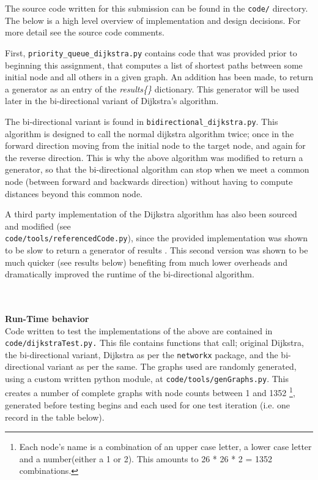 \documentclass[paper=a4, fontsize=11pt]{scrartcl} %
\begin{document}
{The source code written for this submission can be found in the \texttt{code/} directory. The below is a high level overview of implementation and design decisions. For more detail see the source code comments.
\par First, \texttt{priority\_queue\_dijkstra.py} contains code that was provided prior to beginning this assignment, that computes a list of shortest paths between some initial node and all others in a given graph. An addition has been made, to return a generator as an entry of the {\it results\{\}} dictionary. This generator will be used later in the bi-directional variant of Dijkstra's algorithm. 
\par The bi-directional variant is found in \texttt{bidirectional\_dijkstra.py}. This algorithm is designed to call the normal dijkstra algorithm twice; once in the forward direction moving from the initial node to the target node, and again for the reverse direction. This is why the above algorithm was modified to return a generator, so that the bi-directional algorithm can stop when we meet a common node (between forward and backwards direction) without having to compute distances beyond this common node. 
\par A third party implementation of the Dijkstra algorithm has also been sourced and modified (see \\ \texttt{code/tools/referencedCode.py}), since the provided implementation was shown to be slow to return a generator of results \cite{theBook}. This second version was shown to be much quicker (see results below) benefiting from much lower overheads and dramatically improved the runtime of the bi-directional algorithm.   }\\\\
{\bf Run-Time behavior}\\
{Code written to test the implementations of the above are contained in \texttt{code/dijkstraTest.py.} This file contains functions that call; original Dijkstra, the bi-directional variant, Dijkstra as per the \texttt{networkx} package, and the bi-directional variant as per the same. The graphs used are randomly generated, using a custom written python module, at \texttt{code/tools/genGraphs.py}. This creates a number of complete graphs with node counts between 1 and 1352 \footnote{Each node's name is a combination of an upper case letter, a lower case letter and a number(either a 1 or 2). This amounts to 26 * 26 * 2 = 1352 combinations.}, generated before testing begins and each used for one test iteration (i.e. one record in the table below).}
\end{document}
